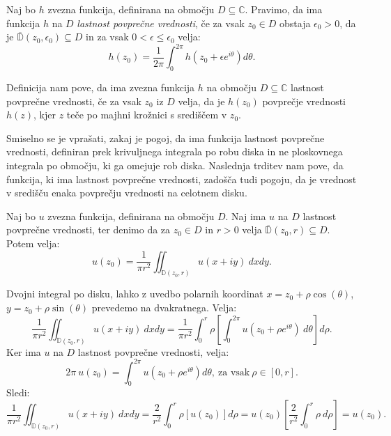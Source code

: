 \documentclass[mat1]{fmfdelo}
\newcommand{\C}{\mathbb C}
\begin{document}
    \begin{definicija}
        Naj bo $h$ zvezna funkcija, definirana na območju $D \subseteq \C$. Pravimo, da ima funkcija $h$ na $D$ \emph{lastnost povprečne vrednosti}, če za vsak $z_0 \in D$ obstaja $\epsilon_0 > 0$, da je $\overline{\mathbb{D}}(z_0, \epsilon_0) \subseteq D$ in za vsak $0 < \epsilon \leq \epsilon_0 $ velja:
        $$
            h(z_0) = \frac{1}{2 \pi} \int_{0}^{2 \pi}{h(z_0 + \epsilon e^{i \theta}) d\theta}.
        $$
    \end{definicija}
    \begin{opomba}
        Definicija nam pove, da ima zvezna funkcija $h$ na območju $D \subseteq \C$ lastnost povprečne vrednosti, če za vsak $z_0$ iz $D$ velja, 
        da je $h(z_0)$ povprečje vrednosti $h(z)$, kjer $z$ teče po majhni krožnici s središčem v $z_0$.
    \end{opomba}

    Smiselno se je vprašati, zakaj je pogoj, da ima funkcija lastnost povprečne vrednosti, definiran prek krivuljnega integrala po robu diska in ne ploskovnega integrala po območju, ki ga omejuje rob diska.
    Naslednja trditev nam pove, da funkcija, ki ima lastnost povprečne vrednosti, zadošča tudi pogoju, da je vrednost v središču enaka povprečju vrednosti na celotnem disku.

    \begin{trditev}
        Naj bo $u$ zvezna funkcija, definirana na območju $D$. Naj ima $u$ na $D$ lastnost povprečne vrednosti, ter denimo da za $z_0 \in D$ in $r>0$ velja $\overline{\mathbb{D}}(z_0,r) \subseteq D$. Potem velja:
        $$
            u(z_0) = \frac{1}{\pi r^2} \iint_{\mathbb{D}(z_0,r)}{u(x + iy)~dxdy}.
        $$
    \end{trditev}
    \begin{dokaz}
        Dvojni integral po disku, lahko z uvedbo polarnih koordinat $x = z_0 + \rho \cos(\theta)$, $y = z_0 + \rho \sin(\theta)$ prevedemo na dvakratnega. Velja:
        $$
        \frac{1}{\pi r^2} \iint_{\mathbb{D}(z_0,r)}{u(x + iy)~dxdy} = \frac{1}{\pi r^2} \int_{0}^{r}{\rho \left[\int_{0}^{2 \pi} u(z_0 + \rho e^{i\theta})~d\theta \right]d\rho}. 
        $$
        Ker ima $u$ na $D$ lastnost povprečne vrednosti, velja:
        $$
            2 \pi~u(z_0) = \int_{0}^{2 \pi}{u(z_0 + \rho e^{i \theta}) d\theta},~\text{za vsak}~\rho \in [0, r].
        $$
        Sledi:
        $$
        \frac{1}{\pi r^2} \iint_{\mathbb{D}(z_0,r)}{u(x + iy)~dxdy} = \frac{2}{r^2} \int_{0}^{r}{\rho \left[u(z_0)\right]d\rho} = u(z_0) \left[\frac{2}{r^2} \int_{0}^{r}{\rho~d\rho}\right] = u(z_0).
        $$
    \end{dokaz}
\end{document}
